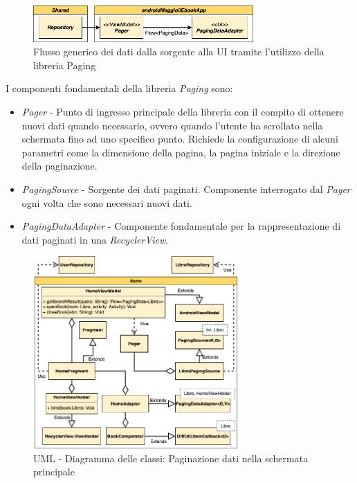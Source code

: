 \begin{figure}[H]
\centering
\includegraphics[width=0.75\textwidth]{img/tesi-2-Page-11.drawio.png}
\caption{Flusso generico dei dati dalla sorgente alla UI tramite l'utilizzo della libreria Paging}
\label{paging}
\end{figure}


I componenti fondamentali della libreria \textit{Paging} sono:
\begin{itemize}
    \item \textit{Pager} - Punto di ingresso principale della libreria con il compito di ottenere nuovi dati quando necessario, ovvero quando l'utente ha scrollato nella schermata fino ad uno specifico punto. Richiede la configurazione di alcuni parametri come la dimensione della pagina, la pagina iniziale e la direzione della paginazione. 
    \item \textit{PagingSource} - Sorgente dei dati paginati. Componente interrogato dal \textit{Pager} ogni volta che sono necessari nuovi dati.
    \item \textit{PagingDataAdapter} - Componente fondamentale per la rappresentazione di dati paginati in una \textit{RecyclerView}.
\end{itemize}

\begin{figure}[H]
\centering
\includegraphics[width=0.7\textwidth]{img/tesi-24-androidviewuml.drawio.png}
\caption{UML - Diagramma delle classi: Paginazione dati nella schermata principale}
\label{paging2}
\end{figure}

